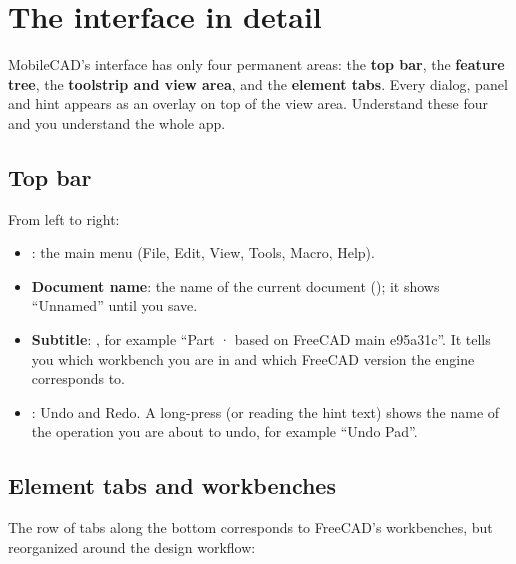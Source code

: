 \chapter{The interface in detail}

MobileCAD's interface has only four permanent areas: the \textbf{top bar}, the \textbf{feature tree}, the
\textbf{toolstrip and view area}, and the \textbf{element tabs}. Every dialog, panel and hint appears as an
overlay on top of the view area. Understand these four and you understand the whole app.


\section{Top bar}

From left to right:

\begin{itemize}
  \item {}: the main menu (File, Edit, View, Tools, Macro, Help).
  \item \textbf{Document name}: the name of the current document (); it shows “Unnamed” until
        you save.
  \item \textbf{Subtitle}: , for example “Part · based on FreeCAD main
        e95a31c”. It tells you which workbench you are in and which FreeCAD version the engine corresponds to.
  \item {}: Undo and Redo. A long-press (or reading the hint text) shows the name of the operation
        you are about to undo, for example “Undo Pad”.
\end{itemize}

\section{Element tabs and workbenches}

The row of tabs along the bottom corresponds to FreeCAD's workbenches, but reorganized around the design
workflow:

